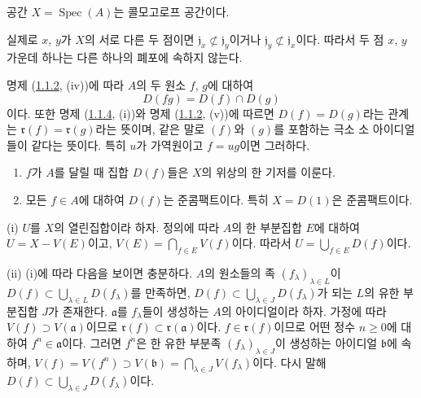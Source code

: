 \begin{corollary}[1.1.8]
\label{I.1.1.8-ko}
공간 $X=\operatorname{Spec}(A)$는 콜모고로프 공간이다.
\end{corollary}

실제로 $x$, $y$가 $X$의 서로 다른 두 점이면
$\mathfrak{j}_x\not\subset\mathfrak{j}_y$이거나
$\mathfrak{j}_y\not\subset\mathfrak{j}_x$이다. 따라서 두 점
$x$, $y$ 가운데 하나는 다른 하나의 폐포에 속하지 않는다.

\begin{env}[1.1.9]
\label{I.1.1.9-ko}
명제 (\hyperref[I.1.1.2-ko]{1.1.2}, (iv))에 따라 $A$의 두 원소
$f$, $g$에 대하여
\begin{equation}
  D(fg)=D(f)\cap D(g)
  \tag{1.1.9.1}\label{I.1.1.9.1-ko}
\end{equation}
이다. 또한 명제 (\hyperref[I.1.1.4-ko]{1.1.4}, (i))와
명제 (\hyperref[I.1.1.2-ko]{1.1.2}, (v))에 따르면
$D(f)=D(g)$라는 관계는
$\mathfrak{r}(f)=\mathfrak{r}(g)$라는 뜻이며, 같은 말로
$(f)$와 $(g)$를 포함하는 극소 소 아이디얼들이 같다는 뜻이다.
특히 $u$가 가역원이고 $f=ug$이면 그러하다.
\end{env}

\begin{proposition}[1.1.10]
\label{I.1.1.10-ko}
\begin{enumerate}
  \item[\rm(i)] $f$가 $A$를 달릴 때 집합 $D(f)$들은 $X$의 위상의
  한 기저를 이룬다.
  \item[\rm(ii)] 모든 $f\in A$에 대하여 $D(f)$는 준콤팩트이다.
  특히 $X=D(1)$은 준콤팩트이다.
\end{enumerate}
\end{proposition}

(i) $U$를 $X$의 열린집합이라 하자. 정의에 따라 $A$의 한 부분집합
$E$에 대하여 $U=X-V(E)$이고,
$V(E)=\bigcap_{f\in E}V(f)$이다. 따라서
$U=\bigcup_{f\in E}D(f)$이다.

(ii) (i)에 따라 다음을 보이면 충분하다. $A$의 원소들의 족
$(f_\lambda)_{\lambda\in L}$이
$D(f)\subset\bigcup_{\lambda\in L}D(f_\lambda)$를 만족하면,
$D(f)\subset\bigcup_{\lambda\in J}D(f_\lambda)$가 되는 $L$의
유한 부분집합 $J$가 존재한다. $\mathfrak{a}$를 $f_\lambda$들이
생성하는 $A$의 아이디얼이라 하자. 가정에 따라
$V(f)\supset V(\mathfrak{a})$이므로
$\mathfrak{r}(f)\subset\mathfrak{r}(\mathfrak{a})$이다.
$f\in\mathfrak{r}(f)$이므로 어떤 정수 $n\geq0$에 대하여
$f^n\in\mathfrak{a}$이다. 그러면 $f^n$은 한 유한 부분족
$(f_\lambda)_{\lambda\in J}$이 생성하는 아이디얼
$\mathfrak{b}$에 속하며,
$V(f)=V(f^n)\supset V(\mathfrak{b})
=\bigcap_{\lambda\in J}V(f_\lambda)$이다. 다시 말해
$D(f)\subset\bigcup_{\lambda\in J}D(f_\lambda)$이다.

